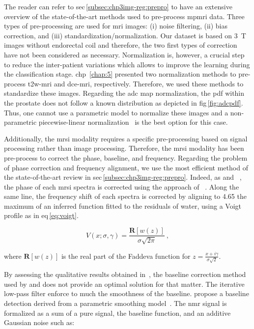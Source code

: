The reader can refer to \acs{sec}\,\ref{subsec:chp3img-reg:prepro} to have an extensive overview of the state-of-the-art methods used to pre-process \ac{mpmri} data.
Three types of pre-processing are used for \ac{mri} images: (i) noise filtering, (ii) bias correction, and (iii) standardization/normalization.
Our dataset is based on \SI{3}{\tesla} images without endorectal coil and therefore, the two first types of correction have not been considered as necessary.
Normalization is, however, a crucial step to reduce the inter-patient variations which allows to improve the learning during the classification stage.
\Ac{chp}~\ref{chap:5} presented two normalization methods to pre-process \ac{t2w}-\ac{mri} and \ac{dce}-\ac{mri}, respectively.
Therefore, we used these methods to standardize these images.
Regarding the \ac{adc} map normalization, the \ac{pdf} within the prostate does not follow a known distribution as depicted in \acs{fig}\,\ref{fig:adcpdf}.
Thus, one cannot use a parametric model to normalize these images and a non-parametric piecewise-linear normalization~\cite{Nyul2000} is the best option for this case.

Additionally, the \ac{mrsi} modality requires a specific pre-processing based on signal processing rather than image processing.
Therefore, the \ac{mrsi} modality has been pre-process to correct the phase, baseline, and frequency.
Regarding the problem of phase correction and frequency alignment, we use the most efficient method of the state-of-the-art review in \acs{sec}\,\ref{subsec:chp3img-reg:prepro}.
Indeed, as \citeauthor{Parfait2012} and \citeauthor{trigui2017automatic}~\cite{Parfait2012,trigui2016classification,trigui2017automatic}, the phase of each \ac{mrsi} spectra is corrected using the approach of \citeauthor{Chen2002}~\cite{Chen2002}.
Along the same line, the frequency shift of each spectra is corrected by aligning to \SI{4.65}{\ppm} the maximum of an inferred function fitted to the residuals of water, using a Voigt profile as in \acs{eq}\,\eqref{eq:voigt}.

\begin{equation}
  V(x; \sigma, \gamma) = \frac{\mathbf{R} \left[ w(z) \right]}{\sigma \sqrt{2\pi}} \ ,
  \label{eq:voigt}
\end{equation}

\noindent where $\mathbf{R} \left[ w(z) \right]$ is the real part of the Faddeva function for $z = \frac{x + i \gamma}{\sigma \sqrt{2}}$.

By assessing the qualitative results obtained in~\cite{Parfait2010}, the baseline correction method used by \citeauthor{Parfait2012} and \citeauthor{trigui2017automatic} does not provide an optimal solution for that matter.
The iterative low-pass filter enforce to much the smoothness of the baseline.
\citeauthor{xi2008baseline} propose a baseline detection derived from a parametric smoothing model~\cite{xi2008baseline}.
The \ac{nmr} signal is formalized as a sum of a pure signal, the baseline function, and an additive Gaussian noise such as:

